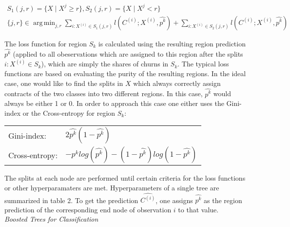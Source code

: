 \documentclass[12pt,titlepage]{article}
\DeclareMathOperator*{\argmin}{arg\,min}
\begin{document}
\begin{equation} \label{dec_tree}
    \begin{aligned}
        S_{1}(j, r) = \{X\mid X^{j}\geq r\} , S_{2}(j, r) = \{X\mid X^{j}< r\} \\
        \{j, r\} \in \argmin_{j, r} \sum_{i:X^{(i)}\in S_{1}(j, r)}l(C^{(i)}; X^{(i)}, \widehat{p^{k}}) + \sum_{i:X^{(i)}\in S_{2}(j, r)}l(C^{(i)}; X^{(i)}, \widehat{p^{k}})
    \end{aligned}
\end{equation}

The loss function for region $S_{k}$ is calculated using the resulting region prediction $\widehat{p^{k}}$ (applied to all obeservations which are assigned to this region after the splits $i:X^{(i)}\in S_{k}$), which are simply the shares of churns in $S_{k}$. The typical loss functions are based on evaluating the purity of the resulting regions. In the ideal case, one would like to find the splits in $X$ which always correctly assign contracts of the two classes into two different regions. In this case, $\widehat{p^{k}}$ would always be either 1 or 0. In order to approach this case one either uses the Gini-index or the Cross-entropy for region $S_{k}$: \\

\begin{center}
    \begin{tabular}{ll}
        Gini-index: & $2\widehat{p^{k}}(1-\widehat{p^{k}})$ \\
        Cross-entropy: & $-\widehat{p^{k}}log(\widehat{p^{k}}) - (1-\widehat{p^{k}})log(1-\widehat{p^{k}})$ \\
    \end{tabular}
\end{center}

The splits at each node are performed until certain criteria for the loss functions or other hyperparamaters are met. Hyperparameters of a single tree are summarized in table 2. To get the prediction $\widehat{C^{(i)}}$, one assigns $\widehat{p^{k}}$ as the region prediction of the corresponding end node of observation $i$ to that value. \\

\textit{Boosted Trees for Classification}
\end{document}
